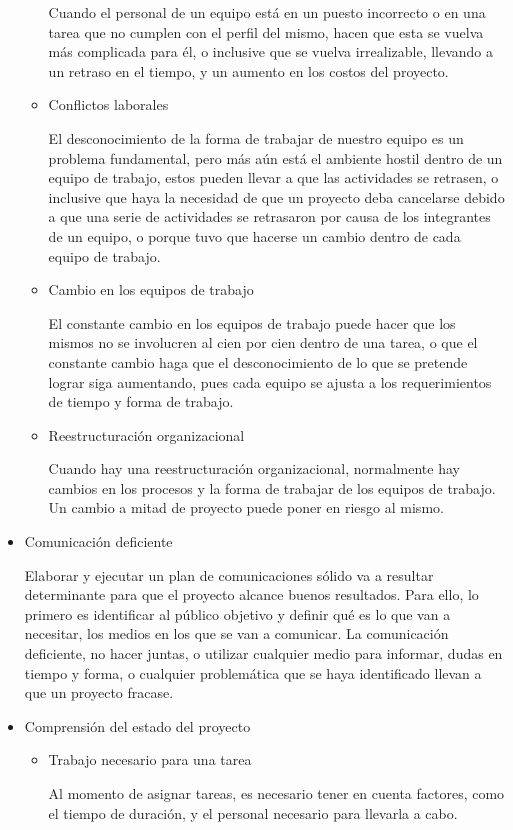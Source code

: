 \begin{itemize}
\begin{itemize}
Cuando el personal de un equipo está en un puesto incorrecto o en una tarea que no cumplen con el perfil del mismo, hacen que esta se vuelva más complicada para él, o inclusive que se vuelva irrealizable, llevando a un retraso en el tiempo, y un aumento en los costos del proyecto. \cite{Adproyectos}
\item Conflictos laborales 

El desconocimiento de la forma de trabajar de nuestro equipo es un problema fundamental, pero más aún está el ambiente hostil dentro de un equipo de trabajo, estos pueden llevar a que las actividades se retrasen, o inclusive que haya la necesidad de que un proyecto deba cancelarse debido a que una serie de actividades se retrasaron por causa de los integrantes de un equipo, o porque tuvo que hacerse un cambio dentro de cada equipo de trabajo. 
\item Cambio en los equipos de trabajo 

 El constante cambio en los equipos de trabajo puede hacer que los mismos no se involucren al cien por cien dentro de una tarea, o que el constante cambio haga que el desconocimiento de lo que se pretende lograr siga aumentando, pues cada equipo se ajusta a los requerimientos de tiempo y forma de trabajo.
 \item Reestructuración organizacional 

Cuando hay una reestructuración organizacional, normalmente hay cambios en los procesos y la forma de trabajar de los equipos de trabajo. Un cambio a mitad de proyecto puede poner en riesgo al mismo.\cite{GrandesErrores}
\end{itemize}
\item Comunicación deficiente 

Elaborar y ejecutar un plan de comunicaciones sólido va a resultar determinante para que el proyecto alcance buenos resultados. Para ello, lo primero es identificar al público objetivo y definir qué es lo que van a necesitar, los medios en los que se van a comunicar. La comunicación deficiente, no hacer juntas, o utilizar cualquier medio para informar, dudas en tiempo y forma, o cualquier problemática que se haya identificado llevan a que un proyecto fracase.
\item Comprensión del estado del proyecto 
\begin{itemize}
\item Trabajo necesario para una tarea 

Al momento de asignar tareas, es necesario tener en cuenta factores, como el tiempo de duración, y el personal necesario para llevarla a cabo. 


\end{itemize}
\end{itemize}

